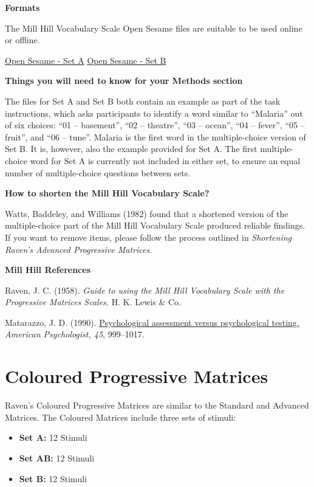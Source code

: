 \documentclass[
]{book}
\providecommand{\tightlist}{%
  \setlength{\itemsep}{0pt}\setlength{\parskip}{0pt}}
\begin{document}
\textbf{Formats}

The Mill Hill Vocabulary Scale Open Sesame files are suitable to be used online or offline.

\href{link\%20here}{Open Sesame - Set A} \textbar{} \href{link\%20here}{Open Sesame - Set B}

\textbf{Things you will need to know for your Methods section}

The files for Set A and Set B both contain an example as part of the task instructions, which asks participants to identify a word similar to ``Malaria'' out of six choices: ``01 -- basement'', ``02 -- theatre'', ``03 -- ocean'', ``04 -- fever'', ``05 -- fruit'', and ``06 -- tune''. Malaria is the first word in the multiple-choice version of Set B. It is, however, also the example provided for Set A. The first multiple-choice word for Set A is currently not included in either set, to ensure an equal number of multiple-choice questions between sets.

\textbf{How to shorten the Mill Hill Vocabulary Scale?}

Watts, Baddeley, and Williams (1982) found that a shortened version of the multiple-choice part of the Mill Hill Vocabulary Scale produced reliable findings. If you want to remove items, please follow the process outlined in \emph{Shortening Raven's Advanced Progressive Matrices.}

\textbf{Mill Hill References}

Raven, J. C. (1958). \emph{Guide to using the Mill Hill Vocabulary Scale with the Progressive Matrices Scales.} H. K. Lewis \& Co.

Matarazzo, J. D. (1990). \href{https://www.gwern.net/docs/psychology/1990-matarazzo.pdf}{Psychological assessment versus psychological testing.} \emph{American Psychologist, 45}, 999--1017.

\hypertarget{coloured-progressive-matrices}{%
\section{Coloured Progressive Matrices}\label{coloured-progressive-matrices}}

Raven's Coloured Progressive Matrices are similar to the Standard and Advanced Matrices. The Coloured Matrices include three sets of stimuli:

\begin{itemize}
\tightlist
\item
  \textbf{Set A:} 12 Stimuli
\item
  \textbf{Set AB:} 12 Stimuli
\item
  \textbf{Set B:} 12 Stimuli
\end{itemize}
\end{document}
